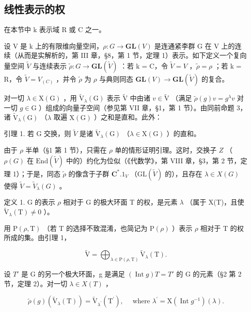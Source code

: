\subsection{线性表示的权}

在本节中 k 表示域 R 或 C 之一。

设 V 是 k 上的有限维向量空间，\(\rho: G \to \mathbf{GL}(V)\) 是连通紧李群 G 在 V 上的连续（从而是实解析的，第 III 章，§8，第 1 节，定理 1）表示。如下定义一个复向量空间 \(\tilde{V}\) 与连续表示 \(\tilde{\rho}: G \to \mathbf{GL}(\tilde{V})\) ：若 k = C，令 \(\tilde{V} = V\) ，\(\tilde{\rho} = \rho\) ；若 k = R，令 \(\tilde{V} = V_{(C)}\) ，并令 \(\tilde{\rho}\) 为 \(\rho\) 与典则同态 \(\mathbf{GL}(V) \to \mathbf{GL}(\tilde{V})\) 的复合。

对一切 \(\lambda \in \mathrm{X}(\mathrm{G})\) ，用 \(\tilde{\mathrm{V}}_{\lambda}(\mathrm{G})\) 表示 \(\tilde{\mathrm{V}}\) 中由诸 \(v \in \tilde{\mathrm{V}}\) （满足 \(\tilde{\rho}(g)v = g^{\lambda}v\) 对一切 \(g \in \mathrm{G}\) ）组成的向量子空间（参见第 VII 章，§1，第 1 节）。由同前命题 3，诸 \(\tilde{\mathrm{V}}_{\lambda}(\mathrm{G})\) （\(\lambda\) 取遍 \(\mathrm{X}(\mathrm{G})\) ）之和是直和。此外：

引理 1. 若 G 交换，则 \(\tilde{V}\) 是诸 \(\tilde{\mathrm{V}}_{\lambda}(\mathrm{G})\) （\(\lambda \in \mathrm{X}(\mathrm{G})\) ）的直和。

由于 \(\rho\) 半单（§1 第 1 节），只需在 \(\rho\) 单的情形证明引理。这时，交换子 \(Z\) （\(\rho(G)\) 在 \(\mathrm{End}(\tilde{V})\) 中的）约化为位似（《代数学》，第 VIII 章，§3，第 2 节，定理 1）；于是，同态 \(\tilde{\rho}\) 的像含于子群 \(\mathbf{C}^*.1_V\) （\(\mathrm{GL}(\tilde{V})\) 的），且存在 \(\lambda \in X(G)\) 使得 \(\tilde{V} = \tilde{V}_{\lambda}(G)\) 。

定义 1. G 的表示 \(\rho\) 相对于 G 的极大环面 T 的权，是元素 \(\lambda\) （属于 X(T)，且使 \(\tilde{\mathrm{V}}_{\lambda}(\mathrm{T}) \neq 0\) ）。

用 \(\mathrm{P}(\rho,\mathrm{T})\) （若 T 的选择不致混淆，也简记为 \(\mathrm{P}(\rho)\) ）表示 \(\rho\) 相对于 T 的权所成的集。由引理 1，

\[
\tilde {\mathrm{V}} = \bigoplus_ {\lambda \in \mathrm{P} (\rho , \mathrm{T})} \tilde {\mathrm{V}} _ {\lambda} (\mathrm{T}).\tag{7}
\]

设 \(T'\) 是 G 的另一个极大环面，g 是满足 \((\operatorname{Int} g)T = T'\) 的 G 的元素（§2 第 2 节，定理 2）。对一切 \(\lambda \in X(T)\) ，

\[
\tilde {\rho} (g) (\tilde {\mathrm{V}} _ {\lambda} (\mathrm{T})) = \tilde {\mathrm{V}} _ {\lambda^ {\prime}} (\mathrm{T} ^ {\prime}), \quad \text { where } \lambda^ {\prime} = \mathrm{X} (\operatorname{Int} g ^ {- 1}) (\lambda).\tag{8}
\]

